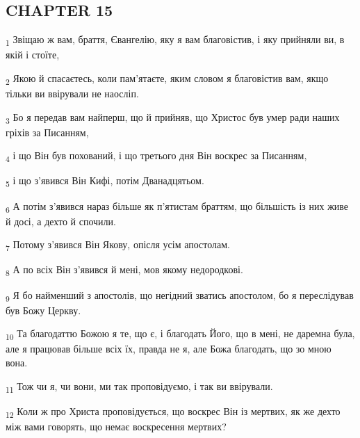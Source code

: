 \subsection{CHAPTER 15}
\begin{tcolorbox}
\textsubscript{1} Звіщаю ж вам, браття, Євангелію, яку я вам благовістив, і яку прийняли ви, в якій і стоїте,
\end{tcolorbox}
\begin{tcolorbox}
\textsubscript{2} Якою й спасаєтесь, коли пам'ятаєте, яким словом я благовістив вам, якщо тільки ви ввірували не наосліп.
\end{tcolorbox}
\begin{tcolorbox}
\textsubscript{3} Бо я передав вам найперш, що й прийняв, що Христос був умер ради наших гріхів за Писанням,
\end{tcolorbox}
\begin{tcolorbox}
\textsubscript{4} і що Він був похований, і що третього дня Він воскрес за Писанням,
\end{tcolorbox}
\begin{tcolorbox}
\textsubscript{5} і що з'явився Він Кифі, потім Дванадцятьом.
\end{tcolorbox}
\begin{tcolorbox}
\textsubscript{6} А потім з'явився нараз більше як п'ятистам браттям, що більшість із них живе й досі, а дехто й спочили.
\end{tcolorbox}
\begin{tcolorbox}
\textsubscript{7} Потому з'явився Він Якову, опісля усім апостолам.
\end{tcolorbox}
\begin{tcolorbox}
\textsubscript{8} А по всіх Він з'явився й мені, мов якому недородкові.
\end{tcolorbox}
\begin{tcolorbox}
\textsubscript{9} Я бо найменший з апостолів, що негідний зватись апостолом, бо я переслідував був Божу Церкву.
\end{tcolorbox}
\begin{tcolorbox}
\textsubscript{10} Та благодаттю Божою я те, що є, і благодать Його, що в мені, не даремна була, але я працював більше всіх їх, правда не я, але Божа благодать, що зо мною вона.
\end{tcolorbox}
\begin{tcolorbox}
\textsubscript{11} Тож чи я, чи вони, ми так проповідуємо, і так ви ввірували.
\end{tcolorbox}
\begin{tcolorbox}
\textsubscript{12} Коли ж про Христа проповідується, що воскрес Він із мертвих, як же дехто між вами говорять, що немає воскресення мертвих?
\end{tcolorbox}
